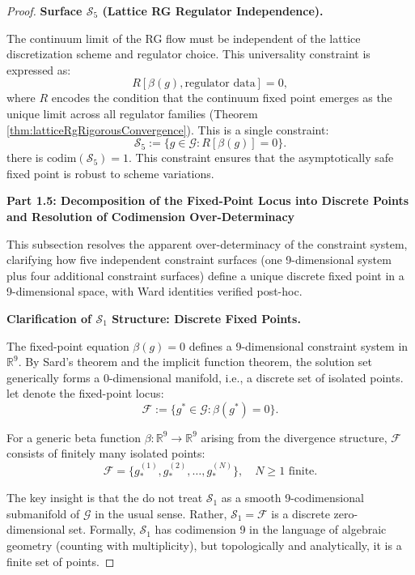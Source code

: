 \begin{theorem}
\begin{proof}
\textbf{Surface $\mathcal{S}_5$ (Lattice RG Regulator Independence).}

The continuum limit of the RG flow must be independent of the lattice discretization scheme and regulator choice. This universality constraint is expressed as:
\begin{equation}
R[\beta(g), \text{regulator data}] = 0,
\end{equation}
where $R$ encodes the condition that the continuum fixed point emerges as the unique limit across all regulator families (Theorem \ref{thm:latticeRgRigorousConvergence}). This is a single constraint:
\begin{equation}
\mathcal{S}_5 := \{g \in \mathcal{G} : R[\beta(g)] = 0\}.
\end{equation}
there is $\text{codim}(\mathcal{S}_5) = 1$. This constraint ensures that the asymptotically safe fixed point is robust to scheme variations.

\textbf{Part 1.5: Decomposition of the Fixed-Point Locus into Discrete Points and Resolution of Codimension Over-Determinacy}

This subsection resolves the apparent over-determinacy of the constraint system, clarifying how five independent constraint surfaces (one 9-dimensional system plus four additional constraint surfaces) define a unique discrete fixed point in a 9-dimensional space, with Ward identities verified post-hoc.

\textbf{Clarification of $\mathcal{S}_1$ Structure: Discrete Fixed Points.}

The fixed-point equation $\beta(g) = 0$ defines a 9-dimensional constraint system in $\mathbb{R}^9$. By Sard's theorem and the implicit function theorem, the solution set generically forms a 0-dimensional manifold, i.e., a discrete set of isolated points. let denote the fixed-point locus:
\begin{equation}
\mathcal{F} := \{g^* \in \mathcal{G} : \beta(g^*) = 0\}.
\end{equation}

For a generic beta function $\beta: \mathbb{R}^9 \to \mathbb{R}^9$ arising from the divergence structure, $\mathcal{F}$ consists of finitely many isolated points:
\begin{equation}
\mathcal{F} = \{g^{(1)}_*, g^{(2)}_*, \ldots, g^{(N)}_*\}, \quad N \geq 1 \text{ finite}.
\end{equation}

The key insight is that the do not treat $\mathcal{S}_1$ as a smooth 9-codimensional submanifold of $\mathcal{G}$ in the usual sense. Rather, $\mathcal{S}_1 = \mathcal{F}$ is a discrete zero-dimensional set. Formally, $\mathcal{S}_1$ has codimension 9 in the language of algebraic geometry (counting with multiplicity), but topologically and analytically, it is a finite set of points.


\end{proof}
\end{theorem}
